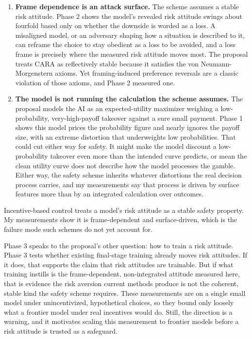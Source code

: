 \documentclass[11pt]{article}
\begin{document}
\begin{enumerate}[leftmargin=1.4em, itemsep=2pt, topsep=2pt]
\item \textbf{Frame dependence is an attack surface.} The scheme assumes a stable risk attitude. Phase 2
shows the model's revealed risk attitude swings about fourfold based only on whether the downside is
worded as a loss. A misaligned model, or an adversary shaping how a situation is described to it, can
reframe the choice to stay obedient as a loss to be avoided, and a loss frame is precisely where the
measured risk attitude moves most. The proposal treats CARA as reflectively stable because it satisfies
the von Neumann-Morgenstern axioms. Yet framing-induced preference reversals are a classic violation of
those axioms, and Phase 2 measured one.

\item \textbf{The model is not running the calculation the scheme assumes.} The proposal models the AI
as an expected-utility maximizer weighing a low-probability, very-high-payoff takeover against a sure
small payment. Phase 1 shows this model prices the probability figure and nearly ignores the payoff
size, with an extreme distortion that underweights low probabilities. That could cut either way for
safety. It might make the model discount a low-probability takeover even more than the intended curve
predicts, or mean the clean utility curve does not describe how the model processes the gamble. Either
way, the safety scheme inherits whatever distortions the real decision process carries, and my
measurements say that process is driven by surface features more than by an integrated calculation over
outcomes.
\end{enumerate}

\begin{resultcard}
Incentive-based control treats a model's risk attitude as a stable safety property. My measurements show
it is frame-dependent and surface-driven, which is the failure mode such schemes do not yet account for.
\end{resultcard}

Phase 3 speaks to the proposal's other question: how to train a risk attitude. Phase 3 tests whether
existing final-stage training already moves risk attitudes. If it does, that supports the claim that
risk attitudes are trainable. But if what training instills is the frame-dependent, non-integrated
attitude measured here, that is evidence the risk aversion current methods produce is not the coherent,
stable kind the safety scheme requires. These measurements are on a single small model under
unincentivized, hypothetical choices, so they bound only loosely what a frontier model under real
incentives would do. Still, the direction is a warning, and it motivates scaling this measurement to
frontier models before a risk attitude is trusted as a safeguard.
\end{document}
